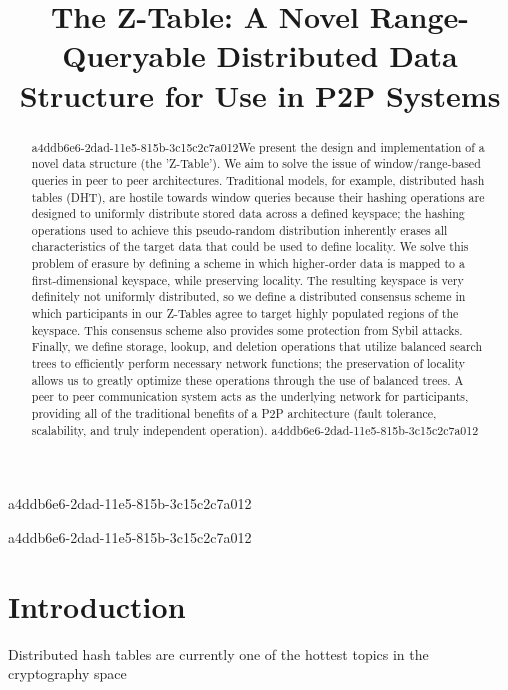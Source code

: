 \documentclass[12pt]{article}
\title{The Z-Table: A Novel Range-Queryable Distributed Data Structure for Use in P2P Systems}
\begin{document}
a4ddb6e6-2dad-11e5-815b-3c15c2c7a012
\maketitle

\begin{abstract}
a4ddb6e6-2dad-11e5-815b-3c15c2c7a012We present the design and implementation of a novel data structure (the 'Z-Table'). We aim to solve the issue of window/range-based queries in peer to peer architectures. Traditional models, for example,  distributed hash tables (DHT), are hostile towards window queries because their hashing operations are designed to uniformly distribute stored data across a defined keyspace; the hashing operations used to achieve this pseudo-random distribution inherently erases all characteristics of the target data that could be used to define locality. We solve this problem of erasure by defining a scheme in which higher-order data is mapped to a first-dimensional keyspace, while preserving locality. The resulting keyspace is very definitely not uniformly distributed, so we define a distributed consensus scheme in which participants in our Z-Tables agree to target highly populated regions of the keyspace. This consensus scheme also provides some protection from Sybil attacks. Finally, we define storage, lookup, and deletion operations that utilize balanced search trees to efficiently perform necessary network functions; the preservation of locality allows us to greatly optimize these operations through the use of balanced trees. A peer to peer communication system acts as the underlying network for participants, providing all of the traditional benefits of a P2P architecture (fault tolerance, scalability, and truly independent operation).
a4ddb6e6-2dad-11e5-815b-3c15c2c7a012\end{abstract}
a4ddb6e6-2dad-11e5-815b-3c15c2c7a012

\newpage
\section{Introduction}
Distributed hash tables are currently one of the hottest topics in the cryptography space~\cite{Stoica:2001dj,Rowstron:2001ea,Ratnasamy:2001wn}

\printbibliography
\end{document}
